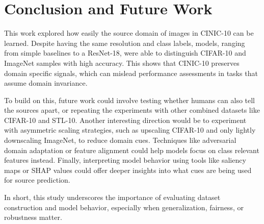 \section{Conclusion and Future Work}

This work explored how easily the source domain of images in CINIC-10 can be learned. Despite having the same resolution and class labels, 
models, ranging from simple baselines to a ResNet-18, were able to distinguish CIFAR-10 and ImageNet samples with high accuracy. This shows that 
CINIC-10 preserves domain specific signals, which can mislead performance assessments in tasks that assume domain invariance.

To build on this, future work could involve testing whether humans can also tell the sources apart, or repeating the experiments with other 
combined datasets like CIFAR-10 and STL-10. Another interesting direction would be to experiment with asymmetric scaling strategies, such as 
upscaling CIFAR-10 and only lightly downscaling ImageNet, to reduce domain cues. Techniques like adversarial domain adaptation or feature alignment 
could help models focus on class relevant features instead. Finally, interpreting model behavior using tools like saliency maps or SHAP values 
could offer deeper insights into what cues are being used for source prediction.

In short, this study underscores the importance of evaluating dataset construction and model behavior, especially when generalization, fairness, or 
robustness matter.